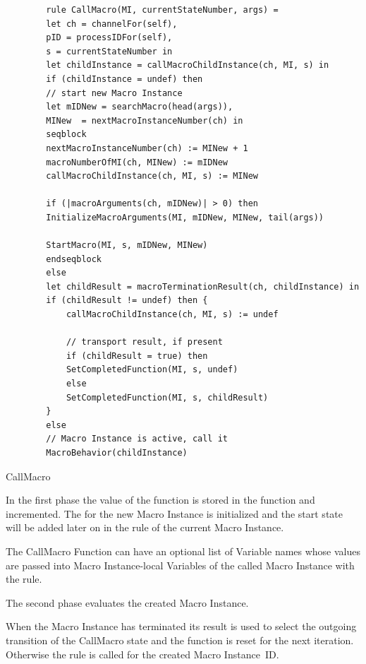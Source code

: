 \begin{listing}[H]
	\begin{verbatim}
		rule CallMacro(MI, currentStateNumber, args) =
		let ch = channelFor(self),
		pID = processIDFor(self),
		s = currentStateNumber in
		let childInstance = callMacroChildInstance(ch, MI, s) in
		if (childInstance = undef) then
		// start new Macro Instance
		let mIDNew = searchMacro(head(args)),
		MINew  = nextMacroInstanceNumber(ch) in
		seqblock
		nextMacroInstanceNumber(ch) := MINew + 1
		macroNumberOfMI(ch, MINew) := mIDNew
		callMacroChildInstance(ch, MI, s) := MINew
		
		if (|macroArguments(ch, mIDNew)| > 0) then
		InitializeMacroArguments(MI, mIDNew, MINew, tail(args))
		
		StartMacro(MI, s, mIDNew, MINew)
		endseqblock
		else
		let childResult = macroTerminationResult(ch, childInstance) in
		if (childResult != undef) then {
			callMacroChildInstance(ch, MI, s) := undef
			
			// transport result, if present
			if (childResult = true) then
			SetCompletedFunction(MI, s, undef)
			else
			SetCompletedFunction(MI, s, childResult)
		}
		else
		// Macro Instance is active, call it
		MacroBehavior(childInstance)
	\end{verbatim}
	\caption{CallMacro}
	\label{lst:shortasm:CallMacro}
\end{listing}


In the first phase the value of the 
function is stored in the  function and
incremented. The  for the new Macro Instance is
initialized and the start state will be added later on in the
 rule of the current Macro Instance.

The CallMacro Function can have an optional list of Variable names whose values
are passed into Macro Instance-local Variables of the called Macro Instance with
the  rule.

The second phase evaluates the created Macro Instance.

When the Macro Instance has terminated its result is used to select the
outgoing transition of the CallMacro state and the 
function is reset for the next iteration. Otherwise the
 rule is called for the created Macro Instance~ID.



